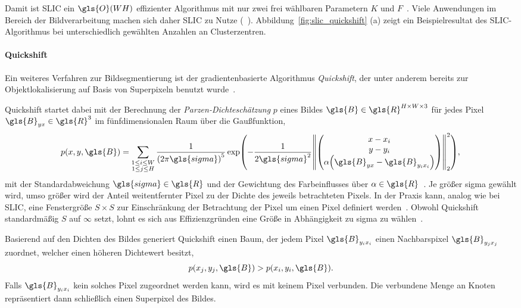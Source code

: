 Damit ist \gls{SLIC} ein $\gls{O}\left(WH\right)$ effizienter Algorithmus mit nur zwei frei wählbaren Parametern $K$ und $F$~\cite{slic}.
Viele Anwendungen im Bereich der Bildverarbeitung machen sich daher \gls{SLIC} zu Nutze (\vgl{}~\cite{Gadde, supercnn, super}).
Abbildung~\ref{fig:slic_quickshift} (a) zeigt ein Beispielresultat des \gls{SLIC}-Algorithmus bei unterschiedlich gewählten Anzahlen an Clusterzentren.



\paragraph{Quickshift}
\label{quickshift}

Ein weiteres Verfahren zur Bildsegmentierung ist der gradientenbasierte Algorithmus \emph{Quickshift}, der unter anderem bereits zur Objektlokalisierung auf Basis von Superpixeln benutzt wurde~\cite{quickshift,Fulkerson}.

Quickshift startet dabei mit der Berechnung der \emph{Parzen-Dichteschätzung} $p$ eines Bildes $\gls{B} \in \gls{R}^{H \times W \times 3}$ für jedes Pixel $\gls{B}_{yx} \in \gls{R}^3$ im fünfdimensionalen Raum über die Gaußfunktion, \dhe{}
\begin{equation*}
  p\left(x,y, \gls{B}\right) = \sum_{\substack{1 \leq i \leq W\\1 \leq j \leq H}}
  \frac{1}{{\left(2\pi\gls{sigma}\right)}^5} \exp\left(-\frac{1}{2\gls{sigma}^2}{\left\|\begin{pmatrix}
    x - x_i\\
    y - y_i\\
    \alpha \left(\gls{B}_{yx} - \gls{B}_{y_i x_i}\right)
  \end{pmatrix}\right\|}_2^2\right),
\end{equation*}
mit der Standardabweichung $\gls{sigma} \in \gls{R}$ und der Gewichtung des Farbeinflusses über $\alpha \in \gls{R}$~\cite{quickshift}.
Je größer \gls{sigma} gewählt wird, umso größer wird der Anteil weitentfernter Pixel zu der Dichte des jeweils betrachteten Pixels.
In der Praxis kann, analog wie bei \gls{SLIC}, eine Fenstergröße $S \times S$ zur Einschränkung der Betrachtung der Pixel um einen Pixel definiert werden~\cite{super}.
Obwohl Quickshift standardmäßig $S$ auf $\infty$ setzt, lohnt es sich aus Effizienzgründen eine Größe in Abhängigkeit zu \gls{sigma} zu wählen~\cite{quickshift}.

Basierend auf den Dichten des Bildes generiert Quickshift einen Baum, der jedem Pixel $\gls{B}_{y_i x_i}$ einen Nachbarspixel $\gls{B}_{y_j x_j}$ zuordnet, welcher einen höheren Dichtewert besitzt, \dhe{}
\begin{equation*}
  p\left(x_j, y_j, \gls{B}\right) > p\left(x_i, y_i, \gls{B}\right).
\end{equation*}
Falls $\gls{B}_{y_i x_i}$ kein solches Pixel zugeordnet werden kann, wird es mit keinem Pixel verbunden.
Die verbundene Menge an Knoten repräsentiert dann schließlich einen Superpixel des Bildes.

